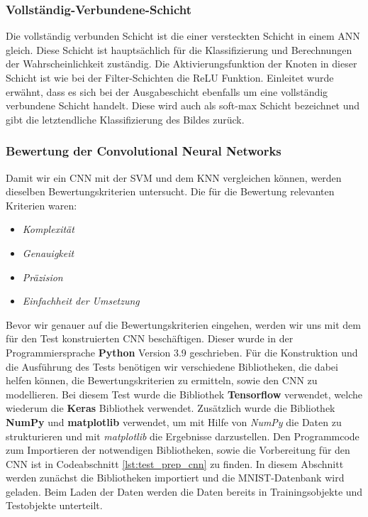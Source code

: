 \subsubsection{Vollständig-Verbundene-Schicht}

Die vollständig verbunden Schicht ist die einer versteckten Schicht in einem ANN gleich. Diese Schicht ist hauptsächlich für die Klassifizierung und Berechnungen der Wahrscheinlichkeit zuständig. Die Aktivierungsfunktion der Knoten in dieser Schicht ist wie bei der Filter-Schichten die ReLU Funktion.
Einleitet wurde erwähnt, dass es sich bei der Ausgabeschicht ebenfalls um eine vollständig verbundene Schicht handelt. Diese wird auch als soft-max Schicht bezeichnet und gibt die letztendliche Klassifizierung des Bildes zurück.\cite*{Sewak2018}

\newpage

\subsubsection{Bewertung der Convolutional Neural Networks}

Damit wir ein CNN mit der SVM und dem KNN vergleichen können, werden dieselben Bewertungskriterien untersucht. Die für die Bewertung relevanten Kriterien waren:

\begin{itemize}
\item \textit{Komplexität}
\item \textit{Genauigkeit}
\item \textit{Präzision}
\item \textit{Einfachheit der Umsetzung}
\end{itemize}

Bevor wir genauer auf die Bewertungskriterien eingehen, werden wir uns mit dem für den Test konstruierten CNN beschäftigen.
Dieser wurde in der Programmiersprache \textbf{Python} Version 3.9 geschrieben. Für die Konstruktion und die Ausführung des Tests benötigen wir verschiedene Bibliotheken, die dabei helfen können, die Bewertungskriterien zu ermitteln, sowie den CNN zu modellieren. Bei diesem Test wurde die Bibliothek \textbf{Tensorflow} verwendet, welche wiederum die \textbf{Keras} Bibliothek verwendet. Zusätzlich wurde die Bibliothek \textbf{NumPy} und \textbf{matplotlib} verwendet, um mit Hilfe von \textit{NumPy} die Daten zu strukturieren und mit \textit{matplotlib} die Ergebnisse darzustellen. Den Programmcode zum Importieren der notwendigen Bibliotheken, sowie die Vorbereitung für den CNN ist in Codeabschnitt \ref{lst:test_prep_cnn} zu finden. In diesem Abschnitt werden zunächst die Bibliotheken importiert und die MNIST-Datenbank wird geladen. Beim Laden der Daten werden die Daten bereits in Trainingsobjekte und Testobjekte unterteilt.


